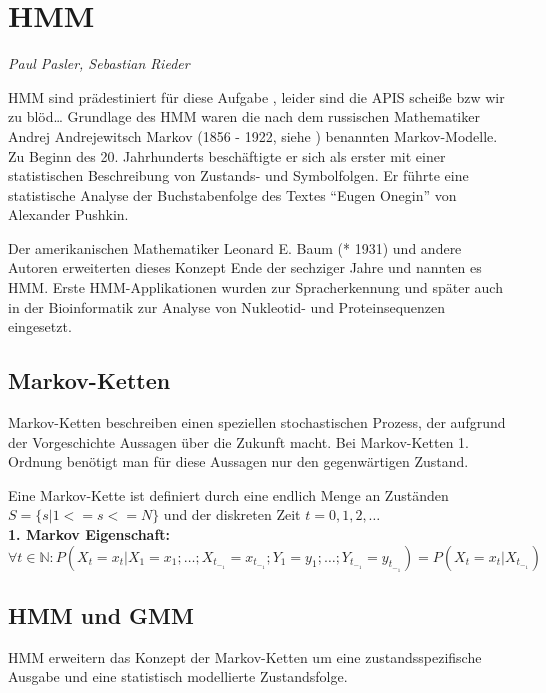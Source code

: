 ﻿\section{\acl{HMM}}
\textit{Paul Pasler, Sebastian Rieder}

\acl{HMM} sind prädestiniert für diese Aufgabe \cite{mmmFink}, leider sind die APIS scheiße bzw wir zu blöd\ldots
\cite{rabiner}
Grundlage des \acl{HMM} waren die nach dem russischen Mathematiker Andrej Andrejewitsch Markov 
(1856 - 1922, siehe \cite{wiki:markov}) benannten Markov-Modelle. Zu Beginn des 20. Jahrhunderts 
beschäftigte er sich als erster mit einer statistischen Beschreibung von Zustands- und Symbolfolgen. 
Er führte eine statistische Analyse der Buchstabenfolge des Textes ``Eugen Onegin'' von Alexander 
Pushkin.

Der amerikanischen Mathematiker Leonard E. Baum (* 1931) und andere Autoren erweiterten dieses Konzept Ende der 
sechziger Jahre und nannten es \acl{HMM}. Erste \acl{HMM}-Applikationen wurden zur Spracherkennung und später auch in der Bioinformatik 
zur Analyse von Nukleotid- und Proteinsequenzen eingesetzt. 
 
\subsection{Markov-Ketten}
Markov-Ketten beschreiben einen speziellen stochastischen Prozess, der aufgrund der Vorgeschichte Aussagen über die Zukunft macht.
Bei Markov-Ketten 1. Ordnung benötigt man für diese Aussagen nur den gegenwärtigen Zustand.


Eine Markov-Kette ist definiert durch eine endlich Menge an Zuständen \( S = \{ s | 1 <= s <= N \} \) und der diskreten Zeit \( t = 0, 1, 2, \ldots \) \\
\textbf{1. Markov Eigenschaft: } \\
\( \forall t \in \mathbb{N} : P (X_t = x_t | X_1 = x_1 ; \ldots ; X_t_-_1 = x_t_-_1 ; Y_1 = y_1 ; \ldots ; Y_t_-_1 = y_t_-_1 ) = P (X_t = x_t | X_t_-_1) \) \\


\subsection{\acl{HMM} und \acl{GMM}}
\acl{HMM} erweitern das Konzept der Markov-Ketten um eine zustandsspezifische Ausgabe und eine statistisch 
modellierte Zustandsfolge.

